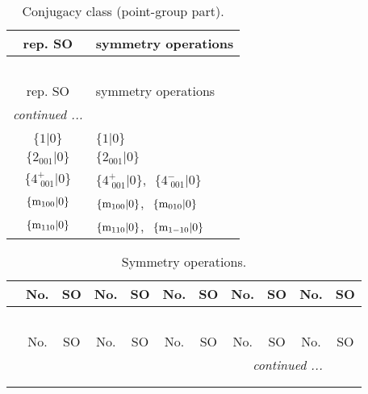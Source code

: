 \documentclass[fleqn,10pt,landscape]{article}
\begin{document}
\begin{itemize}
\begin{center}
\renewcommand{\arraystretch}{1.3}
\begin{longtable}{c|l}
\caption{Conjugacy class (point-group part).}
 \\
 \hline \hline
rep. SO & symmetry operations \\ \hline \endfirsthead

\multicolumn{1}{l}{\tablename\ \thetable{}} \\
 \hline \hline
rep. SO & symmetry operations \\ \hline \endhead

 \hline \hline
\multicolumn{1}{r}{\footnotesize\it continued ...} \\ \endfoot

 \hline \hline
\multicolumn{1}{r}{} \\ \endlastfoot

$\{1|0\}$ & $\{1|0\}$ \\ \hline
$\{2{}_{001}|0\}$ & $\{2{}_{001}|0\}$ \\ \hline
$\{4^{+}_{\,\,001}|0\}$ & $\{4^{+}_{\,\,001}|0\}$,\,\, $\{4^{-}_{\,\,001}|0\}$ \\ \hline
$\{{\rm m}_{100}|0\}$ & $\{{\rm m}_{100}|0\}$,\,\, $\{{\rm m}_{010}|0\}$ \\ \hline
$\{{\rm m}_{110}|0\}$ & $\{{\rm m}_{110}|0\}$,\,\, $\{{\rm m}_{1-10}|0\}$ \\
\end{longtable}
\end{center}
\begin{center}
\renewcommand{\arraystretch}{1.3}
\begin{longtable}{c|cc|cc|cc|cc|cc}
\caption{Symmetry operations.}
 \\
 \hline \hline
 & No. & SO & No. & SO & No. & SO & No. & SO & No. & SO \\ \hline \endfirsthead

\multicolumn{10}{l}{\tablename\ \thetable{}} \\
 \hline \hline
 & No. & SO & No. & SO & No. & SO & No. & SO & No. & SO \\ \hline \endhead

 \hline \hline
\multicolumn{10}{r}{\footnotesize\it continued ...} \\ \endfoot

 \hline \hline
\multicolumn{10}{r}{} \\ \endlastfoot


\end{longtable}
\end{center}
\end{itemize}
\end{document}
